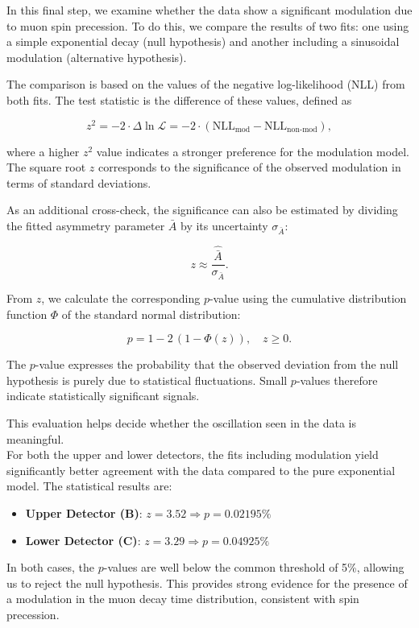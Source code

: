 In this final step, we examine whether the data show a significant modulation due to muon spin precession. To do this, we compare the results of two fits: one using a simple exponential decay (null hypothesis) and another including a sinusoidal modulation (alternative hypothesis).

The comparison is based on the values of the negative log-likelihood (NLL) from both fits. The test statistic is the difference of these values, defined as

\begin{equation}
    z^2 = -2 \cdot \Delta \ln \mathcal{L} = -2 \cdot (\mathrm{NLL}_{\text{mod}} - \mathrm{NLL}_{\text{non-mod}}),
\end{equation}

where a higher $z^2$ value indicates a stronger preference for the modulation model. The square root $z$ corresponds to the significance of the observed modulation in terms of standard deviations.

As an additional cross-check, the significance can also be estimated by dividing the fitted asymmetry parameter $\bar{A}$ by its uncertainty $\sigma_{\bar{A}}$:

\begin{equation}
    z \approx \frac{\hat{\bar{A}}}{\sigma_{\bar{A}}}.
\end{equation}

From $z$, we calculate the corresponding $p$-value using the cumulative distribution function $\Phi$ of the standard normal distribution:

\begin{equation}
    p = 1 - 2\,(1 - \Phi(z)), \quad z \ge 0.
\end{equation}

The $p$-value expresses the probability that the observed deviation from the null hypothesis is purely due to statistical fluctuations. Small $p$-values therefore indicate statistically significant signals.

This evaluation helps decide whether the oscillation seen in the data is meaningful.\\

For both the upper and lower detectors, the fits including modulation yield significantly better agreement with the data compared to the pure exponential model. The statistical results are:

\begin{itemize}
    \item \textbf{Upper Detector (B)}: $z = 3.52 \Rightarrow p = 0.02195\%$
    \item \textbf{Lower Detector (C)}:  $z = 3.29 \Rightarrow p = 0.04925\%$
\end{itemize}

In both cases, the $p$-values are well below the common threshold of 5\%, allowing us to reject the null hypothesis. This provides strong evidence for the presence of a modulation in the muon decay time distribution, consistent with spin precession.

